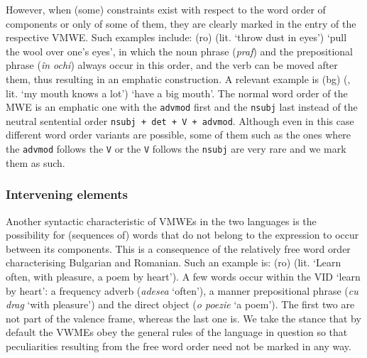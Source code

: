 \documentclass[output=paper,colorlinks,citecolor=brown]{langscibook}
\begin{document}



However, when (some) constraints exist with respect to the word order of components or only of some of them, they are clearly marked in the entry of the respective VMWE. Such examples include: 
(ro)  (lit. `throw dust in eyes') {`pull the wool over one's eyes'}, in which the noun phrase (\textit{praf}) and the prepositional phrase (\textit{în ochi}) always occur in this order, and the verb can be moved after them, thus resulting in an emphatic construction. A relevant example is (bg)  (, lit. `my mouth knows a lot') {`have a big mouth'}. The normal word order of the MWE is an emphatic one with the \texttt{advmod} first and the \texttt{nsubj} last instead of the neutral sentential order \texttt{nsubj + det + V + advmod}. Although even in this case different word order variants are possible, some of them such as the ones where the \texttt{advmod} follows the \texttt{V} or the \texttt{V} follows the \texttt{nsubj} are very rare and we mark them as such.  

\subsubsection{Intervening elements} 
Another syntactic characteristic of VMWEs in the two languages is the possibility for (sequences of) words that do not belong to the expression %
to occur between its components. This is a consequence of the relatively free word order characterising Bulgarian and Romanian. Such an example is:
(ro)  ({lit. `Learn often, with pleasure, a poem by heart'}).
A few words occur within the VID  {`learn by heart'}: a frequency adverb (\textit{adesea} `often'), a manner prepositional phrase (\textit{cu drag} `with pleasure') and the direct object (\textit{o poezie} `a poem'). The first two are not part of the valence frame, whereas the last one is. We take the stance that by default the VWMEs obey the general rules of the language in question so that peculiarities resulting from the free word order need not be marked in any way.
\end{document}
